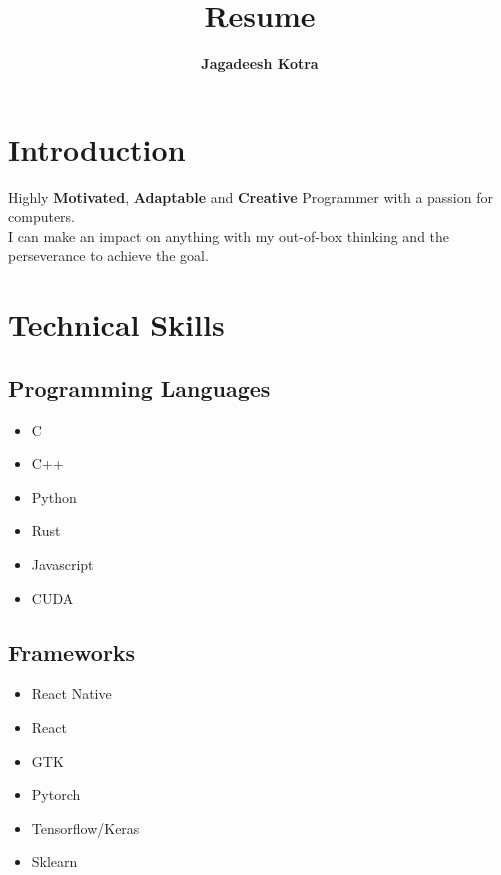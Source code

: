 \documentclass{article}
\date{}
\begin{document}
\title{\LARGE  Resume}
\author{\LARGE \textbf{Jagadeesh Kotra}}
\maketitle

\section{Introduction}

Highly \textbf{Motivated}, \textbf{Adaptable} and \textbf{Creative} Programmer with a passion for computers.\\

I can make an impact on anything with my out-of-box thinking and the perseverance to achieve the goal.

\section{Technical Skills}
\subsection{Programming Languages}
\begin{multicols}{4}
    \begin{itemize}
        \item C
        \item C++
        \item Python
        \item Rust
        \item Javascript
        \item CUDA
    \end{itemize}
\end{multicols}


\subsection{Frameworks}
\begin{multicols}{4}
    \begin{itemize}
        \item React Native
        \item React
        \item GTK
        \item Pytorch
        \item Tensorflow/Keras
        \item Sklearn
    \end{itemize}
\end{multicols}
\end{document}
